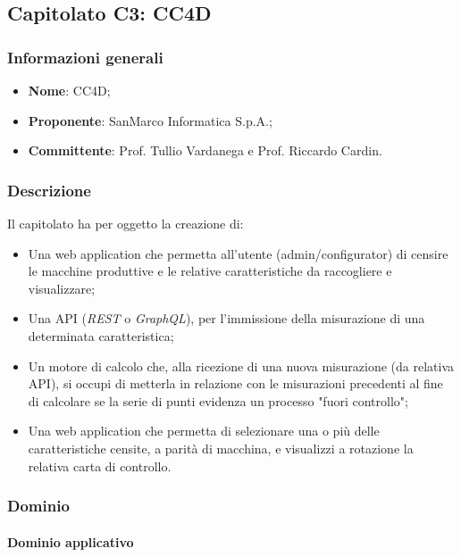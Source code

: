 \documentclass[11pt]{article}
\begin{document}
    \newpage


\subsection{Capitolato C3: CC4D}

    \subsubsection{Informazioni generali}
    \begin{itemize}
        \item \textbf{Nome}: CC4D;
        \item \textbf{Proponente}: SanMarco Informatica S.p.A.;
        \item \textbf{Committente}: Prof. Tullio Vardanega e Prof. Riccardo Cardin.
    \end{itemize}
    
    \subsubsection{Descrizione}
    Il capitolato ha per oggetto la creazione di: 
	\begin{itemize}
		\item Una web application che permetta all'utente (admin/configurator) di censire le macchine produttive e
		le relative caratteristiche da raccogliere e visualizzare;
		\item Una API (\textit{REST} o \textit{GraphQL}), per l'immissione della misurazione di una determinata
		caratteristica;
		\item Un motore di calcolo che, alla ricezione di una nuova misurazione (da relativa API), si occupi di metterla in
		relazione con le misurazioni precedenti al fine di calcolare se la serie di punti evidenza un processo "fuori controllo";
		\item Una web application che permetta di selezionare una o più delle caratteristiche censite, a parità di macchina,
		e visualizzi a rotazione la relativa carta di controllo.
	\end{itemize}	    

    \subsubsection{Dominio}
        \paragraph{Dominio applicativo}~\\
        
\end{document}
